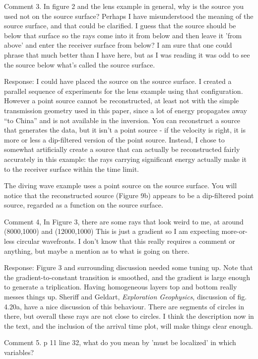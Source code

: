 Comment 3. In figure 2 and the lens example in general, why is the source you used not on the source surface?  Perhaps I have misunderstood the meaning of the source surface, and that could be clarified.  I guess that the source should be below that surface so the rays come into it from below and then leave it 'from above' and enter the receiver surface from below?   I am sure that one could phrase that much better than I have here, but as I was reading it was odd to see the source below what's called the source surface.

Response: I could have placed the source on the source surface. I created a parallel sequence of experiments for the lens example using that configuration. However a point source cannot be reconstructed, at least not with the simple transmission geometry used in this paper, since a lot of energy propagates away ``to China'' and is not available in the inversion. You can reconstruct a source that generates the data, but it isn't a point source - if the velocity is right, it is more or less a dip-filtered version of the point source. Instead, I chose to somewhat artificially create a source that can actually be reconstructed fairly accurately in this example: the rays carrying significant energy actually make it to the receiver surface within the time limit.

The diving wave example uses a point source on the source surface. You will notice that the reconstructed source (Figure 9b) appears to be a dip-filtered point source, regarded as a function on the source surface.

Comment 4, In Figure 3, there are some rays that look weird to me, at around (8000,1000) and (12000,1000) This is just a gradient so I am expecting more-or-less circular wavefronts.  I don't know that this really requires a comment or anything, but maybe a mention as to what is going on there.  

Response: Figure 3 and surrounding discussion needed some tuning up. Note that the gradient-to-constant transition is smoothed, and the gradient is large enough to generate a triplication. Having homogeneous layers top and bottom really messes things up. Sheriff and Geldart, {\em Exploration Geophysics}, discussion of fig. 4.20a, have a nice discussion of this behaviour. There are segments of circles in there, but overall these rays are not close to circles. I think the description now in the text, and the inclusion of the arrival time plot, will make things clear enough.

Comment 5. p 11 line 32, what do you mean by 'must be localized' in which variables?

